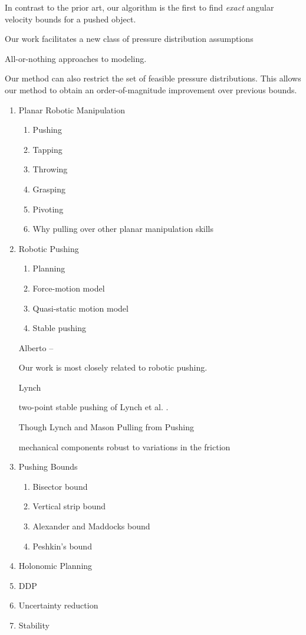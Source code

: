 \documentclass[conference]{IEEEtran}
\begin{document}
In contrast to the prior art, our algorithm is the first to find
\textit{exact} angular velocity bounds for a pushed object. 



Our work facilitates a new class of pressure distribution assumptions 

All-or-nothing approaches to modeling. 

Our method can also restrict the set of feasible pressure
distributions. This allows our method to obtain an order-of-magnitude
improvement over previous bounds.

\begin{enumerate}
\item Planar Robotic Manipulation
  \begin{enumerate}
  \item Pushing
  \item Tapping
  \item Throwing
  \item Grasping
  \item Pivoting
  \item Why pulling over other planar manipulation skills
  \end{enumerate}
\item Robotic Pushing
  \begin{enumerate}
  \item Planning
  \item Force-motion model
  \item Quasi-static motion model
  \item Stable pushing
  \end{enumerate}

  Alberto -- \cite{YuBFR16}


  Our work is most closely related to robotic pushing.

  Lynch 

  two-point stable pushing of Lynch et al. \cite{}.

  Though Lynch and Mason Pulling from Pushing \cite{lynch1995pulling}

  mechanical components robust to variations in the friction

\item Pushing Bounds

  \begin{enumerate}
  \item Bisector bound
  \item Vertical strip bound
  \item Alexander and Maddocks bound
  \item Peshkin's bound
  \end{enumerate}

\item Holonomic Planning
\item DDP
\item Uncertainty reduction
\item Stability
\end{enumerate}
\end{document}
